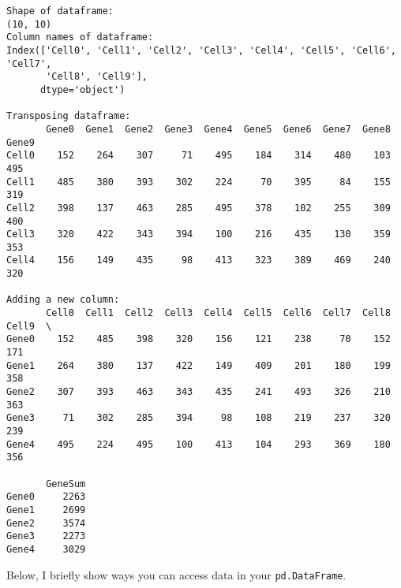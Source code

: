 \documentclass[
  letterpaper,
  DIV=11,
  numbers=noendperiod]{scrartcl}
\begin{document}
\begin{verbatim}
Shape of dataframe:
(10, 10)
Column names of dataframe:
Index(['Cell0', 'Cell1', 'Cell2', 'Cell3', 'Cell4', 'Cell5', 'Cell6', 'Cell7',
       'Cell8', 'Cell9'],
      dtype='object')

Transposing dataframe:
       Gene0  Gene1  Gene2  Gene3  Gene4  Gene5  Gene6  Gene7  Gene8  Gene9
Cell0    152    264    307     71    495    184    314    480    103    495
Cell1    485    380    393    302    224     70    395     84    155    319
Cell2    398    137    463    285    495    378    102    255    309    400
Cell3    320    422    343    394    100    216    435    130    359    353
Cell4    156    149    435     98    413    323    389    469    240    320

Adding a new column:
       Cell0  Cell1  Cell2  Cell3  Cell4  Cell5  Cell6  Cell7  Cell8  Cell9  \
Gene0    152    485    398    320    156    121    238     70    152    171   
Gene1    264    380    137    422    149    409    201    180    199    358   
Gene2    307    393    463    343    435    241    493    326    210    363   
Gene3     71    302    285    394     98    108    219    237    320    239   
Gene4    495    224    495    100    413    104    293    369    180    356   

       GeneSum  
Gene0     2263  
Gene1     2699  
Gene2     3574  
Gene3     2273  
Gene4     3029  
\end{verbatim}

Below, I briefly show ways you can access data in your
\texttt{pd.DataFrame}.
\end{document}
